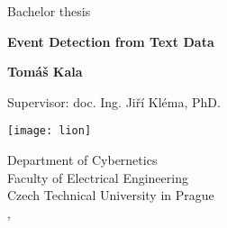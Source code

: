 \begin{titlepage}
	\begin{center}
		\vspace*{1cm}
		
		\LARGE
		Bachelor thesis
		
		\Huge
		\textbf{Event Detection from Text Data}
		
		\vspace{1.5cm}
		
		\Large
		\textbf{Tomáš Kala}

		\vspace{1cm}

		\Large
		Supervisor: doc. Ing. Jiří Kléma, PhD.
		
		\vfill

		\texttt{[image: lion]}
		
		\Large
		Department of Cybernetics\\
		Faculty of Electrical Engineering\\
		Czech Technical University in Prague\\
		\monthname, \the\year
	\end{center}
\end{titlepage}